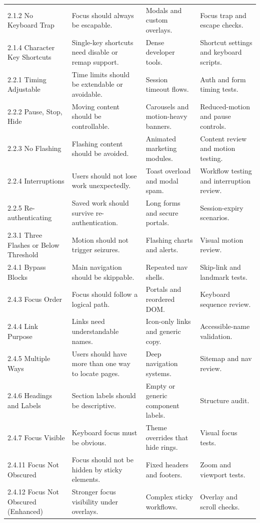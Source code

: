 \begin{longtable}{@{}p{}p{}p{}p{}@{}}
2.1.2 No Keyboard Trap & Focus should always be escapable. & Modals and custom overlays. & Focus trap and escape checks. \\
2.1.4 Character Key Shortcuts & Single-key shortcuts need disable or remap support. & Dense developer tools. & Shortcut settings and keyboard scripts. \\
2.2.1 Timing Adjustable & Time limits should be extendable or avoidable. & Session timeout flows. & Auth and form timing tests. \\
2.2.2 Pause, Stop, Hide & Moving content should be controllable. & Carousels and motion-heavy banners. & Reduced-motion and pause controls. \\
2.2.3 No Flashing & Flashing content should be avoided. & Animated marketing modules. & Content review and motion testing. \\
2.2.4 Interruptions & Users should not lose work unexpectedly. & Toast overload and modal spam. & Workflow testing and interruption review. \\
2.2.5 Re-authenticating & Saved work should survive re-authentication. & Long forms and secure portals. & Session-expiry scenarios. \\
2.3.1 Three Flashes or Below Threshold & Motion should not trigger seizures. & Flashing charts and alerts. & Visual motion review. \\
2.4.1 Bypass Blocks & Main navigation should be skippable. & Repeated nav shells. & Skip-link and landmark tests. \\
2.4.3 Focus Order & Focus should follow a logical path. & Portals and reordered DOM. & Keyboard sequence review. \\
2.4.4 Link Purpose & Links need understandable names. & Icon-only links and generic copy. & Accessible-name validation. \\
2.4.5 Multiple Ways & Users should have more than one way to locate pages. & Deep navigation systems. & Sitemap and nav review. \\
2.4.6 Headings and Labels & Section labels should be descriptive. & Empty or generic component labels. & Structure audit. \\
2.4.7 Focus Visible & Keyboard focus must be obvious. & Theme overrides that hide rings. & Visual focus tests. \\
2.4.11 Focus Not Obscured & Focus should not be hidden by sticky elements. & Fixed headers and footers. & Zoom and viewport tests. \\
2.4.12 Focus Not Obscured (Enhanced) & Stronger focus visibility under overlays. & Complex sticky workflows. & Overlay and scroll checks. \\

\end{longtable}
